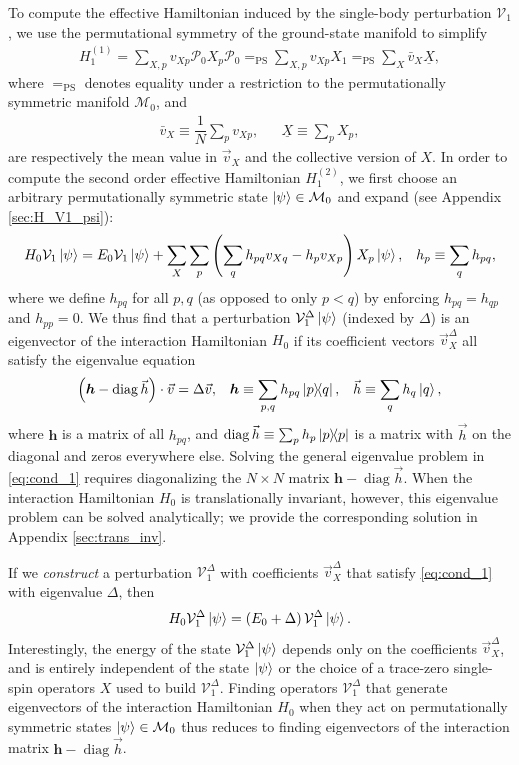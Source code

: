 \documentclass[nofootinbib,notitlepage,11pt]{revtex4-2}
\newcommand{\f}[2]{\dfrac{#1}{#2}} %
\newcommand{\p}[1]{\left(#1\right)} %
\renewcommand{\c}{\cdot} %
\newcommand{\m}{\bm} %
\renewcommand{\v}{\vec} %
\newcommand{\1}{\mathds{1}}
\newcommand{\M}{\mathcal{M}}
\renewcommand{\P}{\mathcal{P}}
\newcommand{\V}{\mathcal{V}}
\newcommand{\EQPS}{=_{\text{PS}}}
\newcommand{\col}{\underline}
\DeclareMathOperator{\diag}{diag}
\begin{document}
To compute the effective Hamiltonian induced by the single-body
perturbation $\V_1$, we use the permutational symmetry of the
ground-state manifold to simplify
\begin{align}
  H_1^{(1)} = \sum_{X,p} v_{Xp} \P_0 X_p \P_0
  \EQPS \sum_{X,p} v_{Xp} X_1
  \EQPS \sum_X \bar v_X \col{X},
  \label{eq:H_1_1}
\end{align}
where $\EQPS$ denotes equality under a restriction to the
permutationally symmetric manifold $\M_0$, and
\begin{align}
  \bar v_X \equiv \f1N \sum_p v_{Xp},
  &&
  \col{X} \equiv \sum_p X_p,
\end{align}
are respectively the mean value in $\v v_X$ and the collective version
of $X$.  In order to compute the second order effective Hamiltonian
$H_1^{(2)}$, we first choose an arbitrary permutationally symmetric
state $\ket\psi\in\M_0$ and expand (see Appendix \ref{sec:H_V1_psi}):
\begin{align}
  H_0 \V_1 \ket\psi
  = E_0 \V_1 \ket\psi
  + \sum_X \sum_p \p{\sum_q h_{pq} v_{Xq} - h_p v_{Xp}} X_p
  \ket\psi,
  &&
  h_p \equiv \sum_q h_{pq},
  \label{eq:H_V1_psi}
\end{align}
where we define $h_{pq}$ for all $p,q$ (as opposed to only $p<q$) by
enforcing $h_{pq}=h_{qp}$ and $h_{pp}=0$.  We thus find that a
perturbation $\V_1^\Delta\ket\psi$ (indexed by $\Delta$) is an
eigenvector of the interaction Hamiltonian $H_0$ if its coefficient
vectors $\v v_X^\Delta$ all satisfy the eigenvalue equation
\begin{align}
  \p{\m h - \diag\v h}\c\v v = \Delta \v v,
  &&
  \m h \equiv \sum_{p,q} h_{pq} \op{p}{q},
  &&
  \v h \equiv \sum_q h_q \ket{q},
  \label{eq:cond_1}
\end{align}
where $\m h$ is a matrix of all $h_{pq}$, and
$\diag\v h\equiv\sum_p h_p \op{p}$ is a matrix with $\v h$ on the
diagonal and zeros everywhere else.  Solving the general eigenvalue
problem in \eqref{eq:cond_1} requires diagonalizing the $N\times N$
matrix $\m h-\diag\v h$.  When the interaction Hamiltonian $H_0$ is
translationally invariant, however, this eigenvalue problem can be
solved analytically; we provide the corresponding solution in Appendix
\ref{sec:trans_inv}.

If we {\it construct} a perturbation $\V_1^\Delta$ with coefficients
$\v v_X^\Delta$ that satisfy \eqref{eq:cond_1} with eigenvalue
$\Delta$, then
\begin{align}
  H_0 \V_1^\Delta \ket\psi = \p{E_0 + \Delta} \V_1^\Delta \ket\psi.
\end{align}
Interestingly, the energy of the state $\V_1^\Delta\ket\psi$ depends
only on the coefficients $\v v_X^\Delta$, and is entirely independent
of the state $\ket\psi$ or the choice of a trace-zero single-spin
operators $X$ used to build $\V_1^\Delta$.  Finding operators
$\V_1^\Delta$ that generate eigenvectors of the interaction
Hamiltonian $H_0$ when they act on permutationally symmetric states
$\ket\psi\in\M_0$ thus reduces to finding eigenvectors of the
interaction matrix $\m h-\diag\v h$.
\end{document}
